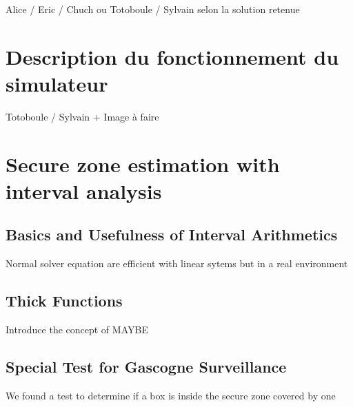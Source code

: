 \documentclass[10pt,a4paper]{report}
\begin{document}

Alice / Eric / Chuch ou Totoboule / Sylvain selon la solution retenue

\section{Description du fonctionnement du simulateur}

Totoboule / Sylvain + Image à faire

\section{Secure zone estimation with interval analysis}

\subsection{Basics and Usefulness of Interval Arithmetics}
 
Normal solver equation are efficient with linear sytems but in a real environment 

\subsection{Thick Functions}

Introduce the concept of MAYBE

\subsection{Special Test for Gascogne Surveillance}

We found a test to determine if a box is inside the secure zone covered 
by one 
\end{document}
